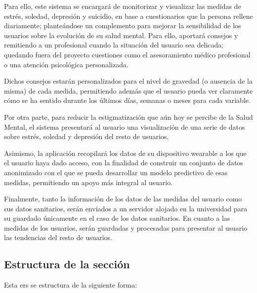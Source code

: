         Para ello, este sistema se encargará de monitorizar y visualizar las medidas de estrés, soledad, depresión y suicidio, en base a cuestionarios que la persona rellene diariamente; planteándose un complemento para mejorar la sensibilidad de los usuarios sobre la evolución de su salud mental. Para ello, aportará consejos y remitiendo a un profesional cuando la situación del usuario sea delicada; quedando fuera del proyecto cuestiones como el asesoramiento médico profesional o una atención psicológica personalizada.

        Dichos consejos estarán personalizados para el nivel de gravedad (o ausencia de la misma) de cada medida, permitiendo además que el usuario pueda ver claramente cómo se ha sentido durante los últimos días, semanas o meses para cada variable.
        

        Por otra parte, para reducir la estigmatización que aún hoy se percibe de la Salud Mental, el sistema presentará al usuario una visualización de una serie de datos sobre estrés, soledad y depresión del resto de usuarios.

        Asimismo, la aplicación recopilará los datos de su dispositivo \gls{wearable} a los que el usuario haya dado acceso, con la finalidad de construir un conjunto de datos anonimizado con el que se pueda desarrollar un modelo predictivo de esas medidas, permitiendo un apoyo más integral al usuario. 

        Finalmente, tanto la información de los datos de las medidas del usuario como sus datos sanitarios, serán enviados a un servidor alojado en la universidad para su guardado únicamente en el caso de los datos sanitarios. En cuanto a las medidas de los usuarios, serán guardadas y procesadas para presentar al usuario las tendencias del resto de usuarios.

        
    \subsection{Estructura de la sección}

        Esta \gls{ers} se estructura de la siguiente forma:

